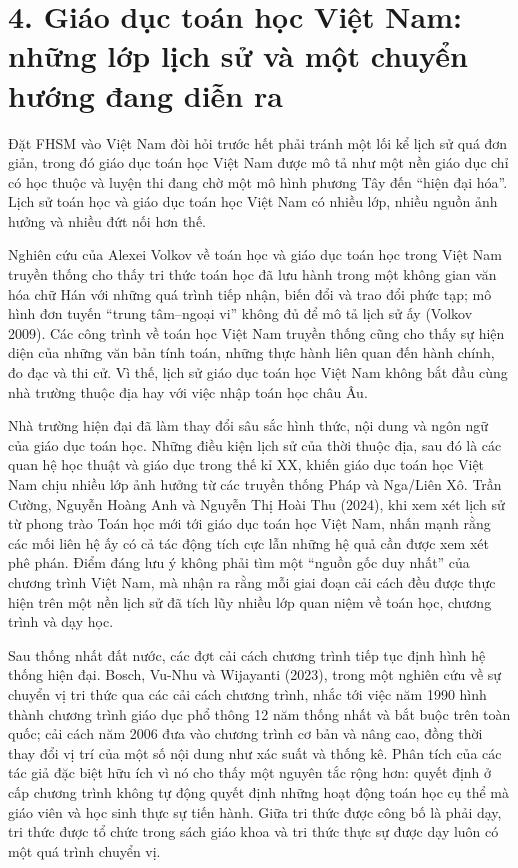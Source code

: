 \section*{4. Giáo dục toán học Việt Nam: những lớp lịch sử và một chuyển hướng đang diễn ra}

Đặt FHSM vào Việt Nam đòi hỏi trước hết phải tránh một lối kể lịch sử quá
đơn giản, trong đó giáo dục toán học Việt Nam được mô tả như một nền giáo dục
chỉ có học thuộc và luyện thi đang chờ một mô hình phương Tây đến ``hiện đại
hóa''. Lịch sử toán học và giáo dục toán học Việt Nam có nhiều lớp, nhiều
nguồn ảnh hưởng và nhiều đứt nối hơn thế.

Nghiên cứu của Alexei Volkov về toán học và giáo dục toán học trong Việt Nam
truyền thống cho thấy tri thức toán học đã lưu hành trong một không gian văn
hóa chữ Hán với những quá trình tiếp nhận, biến đổi và trao đổi phức tạp; mô
hình đơn tuyến ``trung tâm--ngoại vi'' không đủ để mô tả lịch sử ấy
(Volkov 2009). Các công trình về toán học Việt Nam truyền thống cũng cho thấy
sự hiện diện của những văn bản tính toán, những thực hành liên quan đến hành
chính, đo đạc và thi cử. Vì thế, lịch sử giáo dục toán học Việt Nam không bắt
đầu cùng nhà trường thuộc địa hay với việc nhập toán học châu Âu.

Nhà trường hiện đại đã làm thay đổi sâu sắc hình thức, nội dung và ngôn ngữ
của giáo dục toán học. Những điều kiện lịch sử của thời thuộc địa, sau đó là
các quan hệ học thuật và giáo dục trong thế kỉ XX, khiến giáo dục toán học
Việt Nam chịu nhiều lớp ảnh hưởng từ các truyền thống Pháp và Nga/Liên Xô.
Trần Cường, Nguyễn Hoàng Anh và Nguyễn Thị Hoài Thu (2024), khi xem xét lịch
sử từ phong trào Toán học mới tới giáo dục toán học Việt Nam, nhấn mạnh rằng
các mối liên hệ ấy có cả tác động tích cực lẫn những hệ quả cần được xem xét
phê phán. Điểm đáng lưu ý không phải tìm một ``nguồn gốc duy nhất'' của
chương trình Việt Nam, mà nhận ra rằng mỗi giai đoạn cải cách đều được thực
hiện trên một nền lịch sử đã tích lũy nhiều lớp quan niệm về toán học, chương
trình và dạy học.

Sau thống nhất đất nước, các đợt cải cách chương trình tiếp tục định hình hệ
thống hiện đại. Bosch, Vu-Nhu và Wijayanti (2023), trong một nghiên cứu về sự
chuyển vị tri thức qua các cải cách chương trình, nhắc tới việc năm 1990 hình
thành chương trình giáo dục phổ thông 12 năm thống nhất và bắt buộc trên toàn
quốc; cải cách năm 2006 đưa vào chương trình cơ bản và nâng cao, đồng thời
thay đổi vị trí của một số nội dung như xác suất và thống kê. Phân tích của
các tác giả đặc biệt hữu ích vì nó cho thấy một nguyên tắc rộng hơn: quyết
định ở cấp chương trình không tự động quyết định những hoạt động toán học cụ
thể mà giáo viên và học sinh thực sự tiến hành. Giữa tri thức được công bố là
phải dạy, tri thức được tổ chức trong sách giáo khoa và tri thức thực sự được
dạy luôn có một quá trình chuyển vị.

